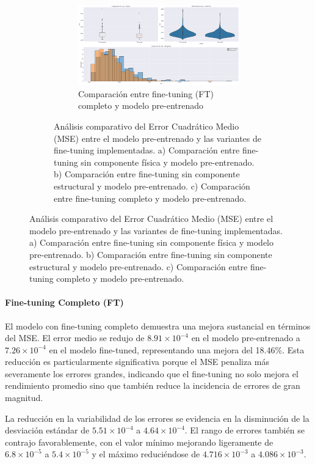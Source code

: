 \begin{figure}
\begin{figure}[H]
        \vspace{0.5cm}
        
        \begin{subfigure}[b]{0.7\textwidth}
            \centering
            \includegraphics[width=\textwidth]{Images/comparison_plots_mse_sup.png}
            \caption{Comparación entre fine-tuning (FT) completo y modelo pre-entrenado}
            \label{fig:mse_no_phy}
        \end{subfigure}
        
        \caption{Análisis comparativo del Error Cuadrático Medio (MSE) entre el modelo pre-entrenado y las variantes de fine-tuning implementadas. a) Comparación entre fine-tuning sin componente física y modelo pre-entrenado. b) Comparación entre fine-tuning sin componente estructural y modelo pre-entrenado. c) Comparación entre fine-tuning completo y modelo pre-entrenado.}
        \label{fig:mse_analysis}
    \end{figure}
\end{figure}


\paragraph{Fine-tuning Completo (FT)}
El modelo con fine-tuning completo demuestra una mejora sustancial en términos del MSE. El error medio se redujo de $8.91 \times 10^{-4}$ en el modelo pre-entrenado a $7.26 \times 10^{-4}$ en el modelo fine-tuned, representando una mejora del 18.46\%. Esta reducción es particularmente significativa porque el MSE penaliza más severamente los errores grandes, indicando que el fine-tuning no solo mejora el rendimiento promedio sino que también reduce la incidencia de errores de gran magnitud.

La reducción en la variabilidad de los errores se evidencia en la disminución de la desviación estándar de $5.51 \times 10^{-4}$ a $4.64 \times 10^{-4}$. El rango de errores también se contrajo favorablemente, con el valor mínimo mejorando ligeramente de $6.8 \times 10^{-5}$ a $5.4 \times 10^{-5}$ y el máximo reduciéndose de $4.716 \times 10^{-3}$ a $4.086 \times 10^{-3}$. 

